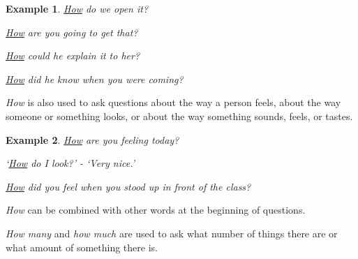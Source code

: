 \documentclass[oneside]{book}
\numberwithin{equation}{section}
\newtheorem{example}{Example}[section]
\begin{document}
\begin{example}
    \underline{How} do we open it?
    
    \underline{How} are you going to get that?
    
    \underline{How} could he explain it to her?
    
    \underline{How} did he know when you were coming?
\end{example}
\textit{How} is also used to ask questions about the way a person feels, about the way someone or something looks, or about the way something sounds, feels, or tastes.
\begin{example}
    \underline{How} are you feeling today?
    
    `\underline{How} do I look?' - `Very nice.'
    
    \underline{How} did you feel when you stood up in front of the class?
\end{example}
%
\noindent{} \textit{How} can be combined with other words at the beginning of questions.

%
\textit{How many} and \textit{how much} are used to ask what number of things there are or what amount of something there is.
\end{document}
